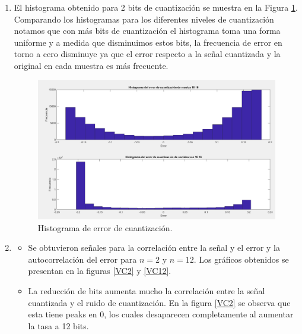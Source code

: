 \documentclass[letterpaper,onecolumn,10pt,journal,final]{IEEEtran}
\begin{document}
\begin{enumerate}[{1)}]
\begin{enumerate}[{a)}]
        \item El histograma obtenido para 2 bits de cuantización se muestra en la Figura \ref{V2b}.
        Comparando los histogramas para los diferentes niveles de cuantización notamos que con más bits de cuantización el histograma toma una forma uniforme y a medida que disminuimos estos bits, la frecuencia de error en torno a cero disminuye ya que el error respecto a la señal cuantizada y la original en cada muestra es más frecuente.
        
        \begin{figure}[H]
        \centering
        \includegraphics[scale=0.4]{Figuras/plotV2b.png}
        \caption{Histograma de error de cuantización.}\label{V2b}
        \end{figure}
        
        \item 
        \begin{itemize}
        \item
        Se obtuvieron señales para la correlación entre la señal y el error y la autocorrelación del error para $n=2$ y $n=12$. Los gráficos obtenidos se presentan en la figuras \ref{VC2} y \ref{VC12}.
        \item 
        La reducción de bits aumenta mucho la correlación entre la señal cuantizada y el ruido de cuantización. En la figura \ref{VC2} se observa que esta tiene peaks en 0, los cuales desaparecen completamente al aumentar la tasa a 12 bits.
        

\end{itemize}
\end{enumerate}
\end{enumerate}
\end{document}
